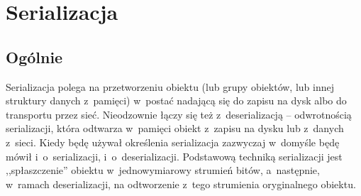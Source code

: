 %
%
%
%
%
%

\section{Serializacja}
\subsection{Ogólnie}
Serializacja polega na przetworzeniu obiektu (lub grupy obiektów, lub innej struktury danych z~pamięci) w~postać nadającą się do zapisu na dysk albo do transportu przez sieć\cite{serialization-basics}. Nieodzownie łączy się też z~deserializacją -- odwrotnością serializacji, która odtwarza w~pamięci obiekt z~zapisu na dysku lub z~danych z~sieci. Kiedy będę używał określenia serializacja zazwyczaj w~domyśle będę mówił i~o~serializacji, i~o~deserializacji. Podstawową techniką serializacji jest ,,spłaszczenie'' obiektu w~jednowymiarowy strumień bitów, a~następnie, w~ramach deserializacji, na odtworzenie z~tego strumienia oryginalnego obiektu.

